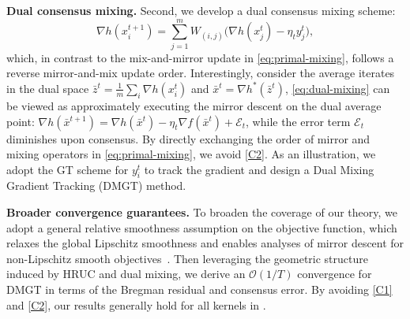 \documentclass{article}
\theoremstyle{plain}
\theoremstyle{definition}
\theoremstyle{remark}
\newcommand{\cO}{\mathcal O}
\begin{document}
\noindent\textbf{Dual consensus mixing. } Second, we develop a dual consensus mixing scheme: 
\begin{equation}
    \label{eq:dual-mixing}
    \nabla h(x_i^{t+1})  = {\sum}_{j=1}^m W_{(i,j)}\big( \nabla h(x_j^{t}) - \eta_t y_j^t \big),  
\end{equation}
which, in contrast to the mix-and-mirror update in \eqref{eq:primal-mixing}, follows a reverse mirror-and-mix update order. Interestingly, consider the average iterates in the dual space $\bar{z}^t = \frac{1}{m}\sum_i\nabla h(x_i^t)$ and $\bar{x}^t=\nabla h^*(\bar{z}^t)$, \eqref{eq:dual-mixing} can be viewed as approximately executing the mirror descent on the dual average point: 
$\nabla h(\bar{x}^{t+1}) = \nabla h(\bar{x}^t) - \eta_t\nabla f(\bar{x}^t) + \mathcal{E}_t$, while the error term $\mathcal{E}_t$ diminishes upon consensus. By directly exchanging the order of mirror and mixing operators in \eqref{eq:primal-mixing}, we avoid \ref{C2}. As an illustration, we adopt the {\sf GT} scheme for $y_i^t$ to track the gradient and design a Dual Mixing Gradient Tracking ({\sf DMGT}) method. \vspace{0.2cm}

\noindent\textbf{Broader convergence guarantees. } To broaden the coverage of our theory, we adopt a general relative smoothness assumption \cite{bauschke2017descent,lu2018relatively,bolte2018first} on the objective function, which relaxes the global Lipschitz smoothness and enables analyses of mirror descent for non-Lipschitz smooth objectives~\cite{bauschke2017descent,lu2018relatively,bolte2018first,latafat2022bregman,fatkhullin2024taming,zhang2024stochastic}. Then
leveraging the geometric structure induced by HRUC and dual mixing, we derive an $\cO(1/T)$ convergence for {\sf DMGT} in terms of the Bregman residual and consensus error. By avoiding \ref{C1} and \ref{C2}, our results generally hold for all kernels in .
 
\end{document}
